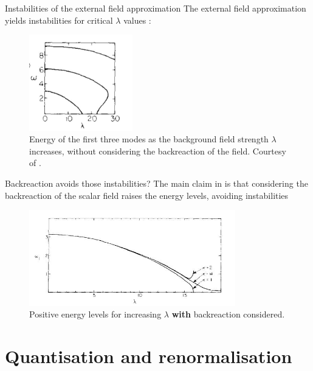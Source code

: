 \begin{frame}{Instabilities of the external field approximation}
	The external field approximation yields instabilities for critical $\lambda$ values \cite{Ambj1983}:
	\begin{figure}[h]
		\centering
		\includegraphics[width=0.4\textwidth]{figures/omega_wolfram.jpeg}
		\caption{Energy of the first three modes as the background field strength  $\lambda$ increases, without considering the backreaction of the field. Courtesy of \cite{Ambj1983}. }
		\label{fig:figures-complex-eigenvalues-png}
	\end{figure}
\end{frame}

\begin{frame}{Backreaction avoids those instabilities?}
	The main claim in \cite{Ambj1983} is that considering the backreaction of the scalar field raises the energy levels, avoiding instabilities
	   \begin{figure}[h]
	   	\centering
	   	\includegraphics[width=0.8\textwidth]{figures/omega_backreaction.jpeg}
		\caption{Positive energy levels for increasing $\lambda$ \textbf{with} backreaction considered. \cite{Ambj1983}}
	   	\label{fig:figures-omega_backreaction-jpeg}
	   \end{figure} 
\end{frame}

\section*{Quantisation and renormalisation}

